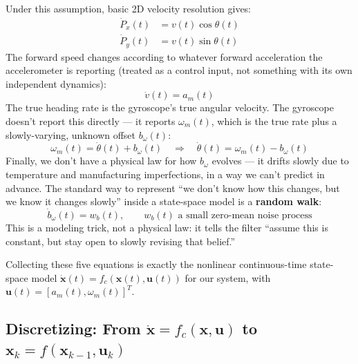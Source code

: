 \documentclass[11pt,a4paper]{article}
\begin{document}
Under this assumption, basic 2D velocity resolution gives:
\begin{align}
    \dot P_x(t) &= v(t)\cos\theta(t) \\
    \dot P_y(t) &= v(t)\sin\theta(t)
\end{align}
The forward speed changes according to whatever forward acceleration the accelerometer is reporting (treated as a control input, not something with its own independent dynamics):
\begin{equation}
    \dot v(t) = a_m(t)
\end{equation}
The true heading rate is the gyroscope's true angular velocity. The gyroscope doesn't report this directly --- it reports $\omega_m(t)$, which is the true rate plus a slowly-varying, unknown offset $b_\omega(t)$:
\begin{equation}
    \omega_m(t) = \dot\theta(t) + b_\omega(t) \quad \Longrightarrow \quad \dot\theta(t) = \omega_m(t) - b_\omega(t)
\end{equation}
Finally, we don't have a physical law for how $b_\omega$ evolves --- it drifts slowly due to temperature and manufacturing imperfections, in a way we can't predict in advance. The standard way to represent ``we don't know how this changes, but we know it changes slowly'' inside a state-space model is a \textbf{random walk}:
\begin{equation}
    \dot b_\omega(t) = w_b(t), \qquad w_b(t) \text{ a small zero-mean noise process}
\end{equation}
This is a modeling trick, not a physical law: it tells the filter ``assume this is constant, but stay open to slowly revising that belief.''

Collecting these five equations is exactly the nonlinear continuous-time state-space model $\dot{\mathbf{x}}(t) = f_c(\mathbf{x}(t), \mathbf{u}(t))$ for our system, with $\mathbf{u}(t) = [a_m(t), \omega_m(t)]^T$.

\subsection{Discretizing: From $\dot{\mathbf{x}} = f_c(\mathbf{x},\mathbf{u})$ to $\mathbf{x}_k = f(\mathbf{x}_{k-1}, \mathbf{u}_k)$}
\end{document}
